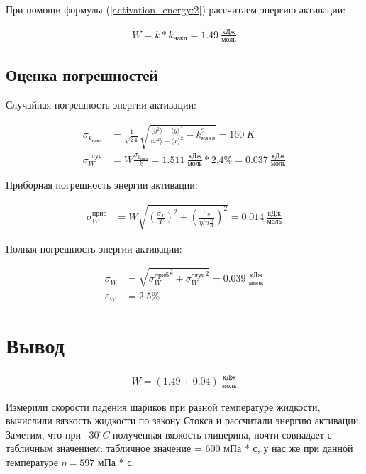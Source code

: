 \documentclass[a4paper, 12pt]{article}
\begin{document}
    При помощи формулы (\ref{activation_energy:2}) рассчитаем энергию активации:

    \begin{align*}
        W = k * k_{накл} = 1.49~\frac{кДж}{моль}
    \end{align*}

    \subsection{Оценка погрешностей}

    Случайная погрешность энергии активации:

    \begin{align*}
        \sigma_{k_{накл}} &= \frac{1}{\sqrt{24}} \sqrt{\frac{\langle y^2 \rangle - {\langle y \rangle}^2}{\langle x^2 \rangle - {\langle x \rangle}^2} - k_{накл}^2} = 160~K\\
        \sigma_W^{случ} &= W \frac{\sigma_{k_{накл}}}{k} = 1.511~\frac{кДж}{моль} * 2.4\% = 0.037~\frac{кДж}{моль}
    \end{align*}

    Приборная погрешность энергии активации:

    \begin{align*}
        \sigma_W^{приб} &= W \sqrt{\left( \frac{\sigma_T}{T} \right)^2 + \left( \frac{\sigma_{\eta}}{\eta ln \frac{\eta}{A}} \right)^2} = 0.014~\frac{кДж}{моль}
    \end{align*}

    Полная погрешность энергии активации:

    \begin{align*}
        \sigma_W &= \sqrt{{\sigma_W^{приб}}^2 + {\sigma_W^{случ}}^2} = 0.039~\frac{кДж}{моль}\\
        \varepsilon_W &= 2.5\%
    \end{align*}

    \section{Вывод}

    \begin{align*}
        W = (1.49 \pm 0.04)~\frac{кДж}{моль}
    \end{align*}

    Измерили скорости падения шариков при разной температуре жидкости, вычислили вязкость жидкости по закону Стокса и рассчитали энергию активации.
    Заметим, что при ~$30^\circ C$ полученная вязкость глицерина, почти совпадает с табличным значением: табличное значение = $600$ мПа * с, у нас же при данной температуре $\eta = 597$ мПа * с.
\end{document}
